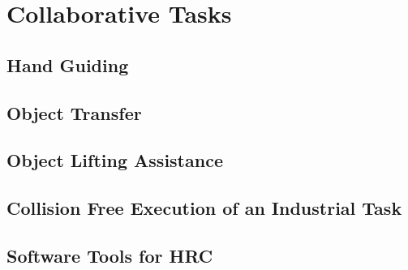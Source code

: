 \chapter{Collaborative Tasks}
\label{chapter:colab-tasks}

\section{Hand Guiding}

\section{Object Transfer}

\section{Object Lifting Assistance}

\section{Collision Free Execution of an Industrial Task}

\section{Software Tools for HRC}
\label{sec:tools-hrc}